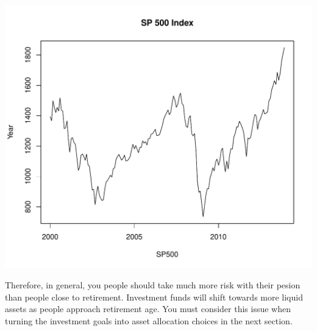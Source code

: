 \documentclass[12pt, a4paper, oneside]{article}\usepackage{graphicx, color}
\makeatletter
\def\maxwidth{ %
  \ifdim\Gin@nat@width>\linewidth
    \linewidth
  \else
    \Gin@nat@width
  \fi
}
\newenvironment{knitrout}{}{} %
\makeatother
\begin{document}
\begin{knitrout}
\color{fgcolor}
\includegraphics[width=\maxwidth]{figure/SP} 

\end{knitrout}

Therefore, in general, you people should take much more risk with their pesion than people close to retirement.  Investment funds will shift towards more liquid assets as people approach retirement age.  You must consider this issue when turning the investment goals into asset allocation choices in the next section. 
\end{document}
